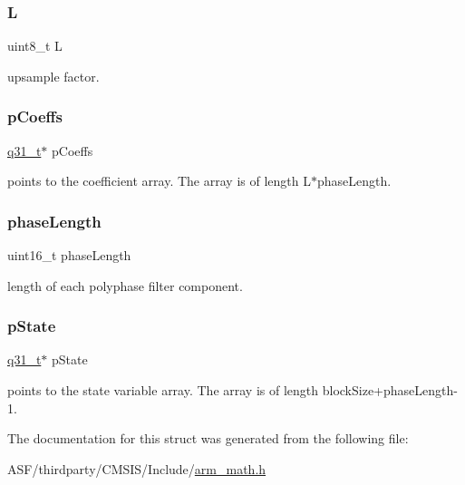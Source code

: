 \subsubsection{\texorpdfstring{L}{L}}
{\footnotesize\ttfamily uint8\+\_\+t L}

upsample factor. \mbox{\label{structarm__fir__interpolate__instance__q31_a68888e36167d81cb7836db10367a1682}} 
\subsubsection{\texorpdfstring{pCoeffs}{pCoeffs}}
{\footnotesize\ttfamily \mbox{\hyperlink{arm__math_8h_adc89a3547f5324b7b3b95adec3806bc0}{q31\+\_\+t}}$\ast$ p\+Coeffs}

points to the coefficient array. The array is of length L$\ast$phase\+Length. \mbox{\label{structarm__fir__interpolate__instance__q31_a8f92bb07e0812f94679438cdf412b26a}} 
\subsubsection{\texorpdfstring{phaseLength}{phaseLength}}
{\footnotesize\ttfamily uint16\+\_\+t phase\+Length}

length of each polyphase filter component. \mbox{\label{structarm__fir__interpolate__instance__q31_adee4ba3ee8869865af7d8fa08ca913d6}} 
\subsubsection{\texorpdfstring{pState}{pState}}
{\footnotesize\ttfamily \mbox{\hyperlink{arm__math_8h_adc89a3547f5324b7b3b95adec3806bc0}{q31\+\_\+t}}$\ast$ p\+State}

points to the state variable array. The array is of length block\+Size+phase\+Length-\/1. 

The documentation for this struct was generated from the following file\+:\begin{DoxyCompactItemize}
\item 
A\+S\+F/thirdparty/\+C\+M\+S\+I\+S/\+Include/\mbox{\hyperlink{arm__math_8h}{arm\+\_\+math.\+h}}\end{DoxyCompactItemize}
